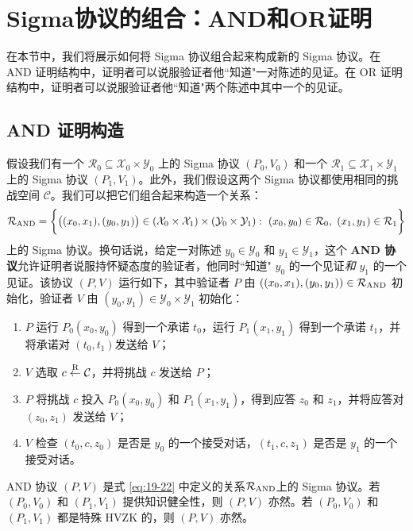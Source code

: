 \section{Sigma协议的组合：AND和OR证明}

在本节中，我们将展示如何将 Sigma 协议组合起来构成新的 Sigma 协议。在 AND 证明结构中，证明者可以说服验证者他``知道"一对陈述的见证。在 OR 证明结构中，证明者可以说服验证者他``知道"两个陈述中其中一个的见证。

\subsection{AND 证明构造}

假设我们有一个 $\mathcal{R}_0\subseteq\mathcal{X}_0\times\mathcal{Y}_0$ 上的 Sigma 协议 $(P_0,V_0)$ 和一个 $\mathcal{R}_1\subseteq\mathcal{X}_1\times\mathcal{Y}_1$ 上的 Sigma 协议 $(P_1,V_1)$。此外，我们假设这两个 Sigma 协议都使用相同的挑战空间 $\mathcal{C}$。我们可以把它们组合起来构造一个关系：
\begin{equation}\label{eq:19-22}
\mathcal{R}_{\rm AND}=
\bigg\lbrace
\big((x_0,x_1),(y_0,y_1)\big)\in\left(\mathcal{X}_0\times\mathcal{X}_1\right)\times\left(\mathcal{Y}_0\times\mathcal{Y}_1\right):~(x_0,y_0)\in\mathcal{R}_0,~(x_1,y_1)\in\mathcal{R}_1
\bigg\rbrace
\end{equation}
上的 Sigma 协议。换句话说，给定一对陈述 $y_0\in\mathcal{Y}_0$ 和 $y_1\in\mathcal{Y}_1$，这个 \textbf{AND 协议}允许证明者说服持怀疑态度的验证者，他同时``知道" $y_0$ 的一个见证\emph{和} $y_1$ 的一个见证。该协议 $(P,V)$ 运行如下，其中验证者 $P$ 由 $((x_0,x_1),(y_0,y_1))\in\mathcal{R}_{\rm AND}$ 初始化，验证者 $V$ 由 $(y_0,y_1)\in\mathcal{Y}_0\times\mathcal{Y}_1$ 初始化：
\begin{enumerate}
	\item $P$ 运行 $P_0(x_0,y_0)$ 得到一个承诺 $t_0$，运行 $P_1(x_1,y_1)$ 得到一个承诺 $t_1$，并将承诺对 $(t_0,t_1)$发送给 $V$；
	\item $V$ 选取 $c\overset{\rm R}\leftarrow\mathcal{C}$，并将挑战 $c$ 发送给 $P$；
	\item $P$ 将挑战 $c$ 投入 $P_0(x_0,y_0)$ 和 $P_1(x_1,y_1)$，得到应答 $z_0$ 和 $z_1$，并将应答对 $(z_0,z_1)$ 发送给 $V$；
	\item $V$ 检查 $(t_0,c,z_0)$ 是否是 $y_0$ 的一个接受对话，$(t_1,c,z_1)$ 是否是 $y_1$ 的一个接受对话。
\end{enumerate}

\begin{theorem}
AND 协议 $(P,V)$ 是式 \ref{eq:19-22} 中定义的关系$\mathcal{R}_{\rm AND}$上的 Sigma 协议。若 $(P_0,V_0)$ 和 $(P_1,V_1)$ 提供知识健全性，则 $(P, V)$ 亦然。若 $(P_0,V_0)$ 和 $(P_1,V_1)$ 都是特殊 HVZK 的，则 $(P,V)$ 亦然。
\end{theorem}

